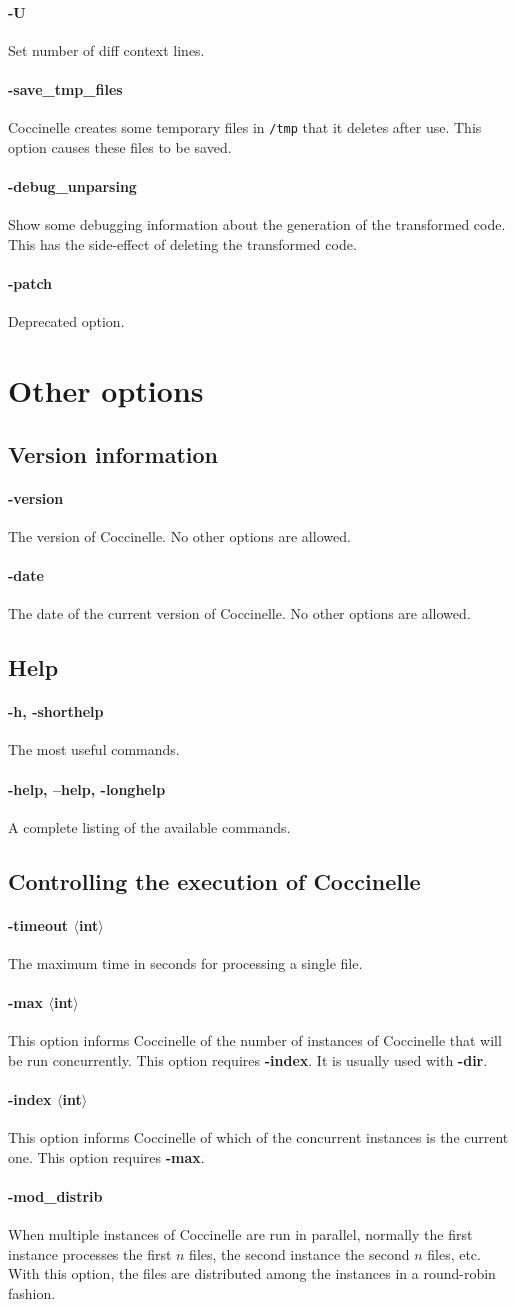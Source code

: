 \documentclass{article}
\newcommand{\minimum}[2]{\paragraph*{\makebox[0in][r]{\FilledBigDiamondshape\,\,} {{#1}}} {#2}}
\newcommand{\normal}[2]{\paragraph*{\makebox[0in][r]{\BigLowerDiamond\,\,} {{#1}}} {#2}}
\newcommand{\rare}[2]{\paragraph*{\makebox[0in][r]{\BigDiamondshape\,\,} {{#1}}} {#2}}
\newcommand{\developer}[2]{\paragraph*{{#1}} {#2}}
\begin{document}
\rare{-U}{ Set number of diff context lines.}

\rare{-save\_tmp\_files}{Coccinelle creates some temporary
  files in {\tt /tmp} that it deletes after use.  This option causes these
  files to be saved.}

\developer{-debug\_unparsing}{Show some debugging information about the
  generation of the transformed code.  This has the side-effect of
  deleting the transformed code.}

\developer{-patch}{ Deprecated option.}


\section{Other options}

\subsection{Version information}

\normal{-version}{ The version of Coccinelle.  No other options are
allowed.}

\normal{-date}{ The date of the current version of Coccinelle. No other
options are allowed.}

\subsection{Help}

\minimum{-h, -shorthelp}{ The most useful commands.}

\minimum{-help, --help, -longhelp}{ A complete listing of the available
commands.}

\subsection{Controlling the execution of Coccinelle}

\normal{-timeout $\langle$int$\rangle$}{ The maximum time in seconds for
  processing a single file.}

\rare{-max $\langle$int$\rangle$}{This option informs Coccinelle of the
  number of instances of Coccinelle that will be run concurrently.  This
  option requires {\bf -index}.  It is usually used with {\bf -dir}.}

\rare{-index $\langle$int$\rangle$}{This option informs Coccinelle of
  which of the concurrent instances is the current one.  This option
  requires {\bf -max}.}

\rare{-mod\_distrib}{When multiple instances of Coccinelle are run in
  parallel, normally the first instance processes the first $n$ files, the
  second instance the second $n$ files, etc.  With this option, the files
  are distributed among the instances in a round-robin fashion.}
\end{document}
